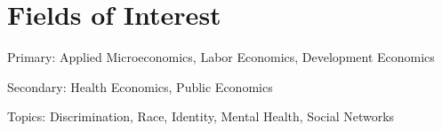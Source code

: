 \documentclass[10pt,letterpaper]{article}
\renewenvironment{itemize}{
  \begin{list}{}{
    \setlength{\leftmargin}{1.5em}
  }
}{
  \end{list}
}
\begin{document}
\section*{Fields of Interest}

Primary: Applied Microeconomics, Labor Economics, Development Economics

Secondary: Health Economics, Public Economics 

Topics: Discrimination, Race, Identity, Mental Health, Social Networks

%
\end{document}

